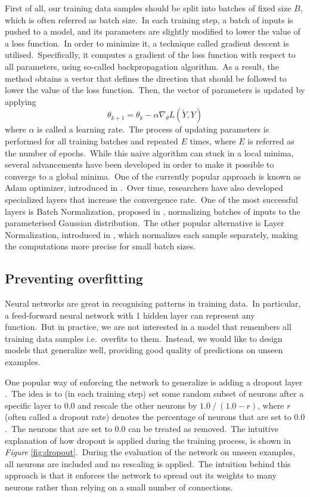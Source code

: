 \documentclass[longabstract, english, mgr]{iithesis}
\theoremstyle{default_theorem_style}\newtheorem{theorem}{Theorem}
\theoremstyle{default_theorem_style}\newtheorem{definition}{Definition}
\begin{document}
\noindent First of all, our training data samples should be split into batches of fixed size $B$, which is often
referred as batch size.\ In each training step, a batch of inputs is pushed to a model, and its parameters
are slightly modified to lower the value of a loss function.\ In order to minimize it, a technique called gradient
descent is utilised.\ Specifically, it computes a gradient of the loss function with respect to all parameters,
using so-called backpropagation algorithm.\ As a result, the method obtains a vector that defines the direction that
should be followed to lower the value of the loss function.\ Then, the vector of parameters is updated by applying
$$
\theta_{k + 1} = \theta_k - \alpha \nabla_{\theta} L(\tilde{Y}, Y)
$$
where $\alpha$ is called a learning rate.\ The process of updating parameters is performed for all training batches and
repeated $E$ times, where $E$ is referred as the number of epochs.\ While this naive algorithm can stuck in a
local minima, several advancements have been developed in order to make it possible to converge to a global minima.\ One
of the currently popular approach is known as Adam optimizer, introduced in \cite{adam_optimizer}.\ Over time,
researchers have also developed specialized layers that increase the convergence rate.\ One of the most successful
layers is Batch Normalization, proposed in \cite{batch_normalization}, normalizing batches of inputs to the
parameterised Gaussian distribution.\ The other popular alternative is Layer Normalization, introduced
in \cite{layer_normalization}, which normalizes each sample separately, making the computations more precise for
small batch sizes.

\subsection{Preventing overfitting}\label{subsec:overfitting}

Neural networks are great in recognising patterns in training data.\ In particular, a feed-forward neural network with
1 hidden layer can represent any function.\ But in practice, we are not interested in a model that remembers all
training data samples i.e.\ overfits to them.\ Instead, we would like to design models that generalize well, providing
good quality of predictions on unseen examples.\newline

\noindent One popular way of enforcing the network to generalize is adding a dropout layer \cite{dropout}.\ The
idea is to (in each training step) set some random subset of neurons after a specific layer
to $0.0$ and rescale the other neurons by $1.0\ /\ (1.0 - r)$, where $r$ (often called a dropout rate) denotes
the percentage of neurons that are set to $0.0$.\ The neurons that are set to $0.0$ can be treated as removed.\ The
intuitive explanation of how dropout is applied during the training process, is shown in
\textit{Figure} \ref{fig:dropout}.\ During the evaluation of the network on unseen examples, all neurons are included
and no rescaling is applied.\ The intuition behind this approach is that it enforces the network to spread out its
weights to many neurons rather than relying on a small number of connections.\newline
\end{document}
